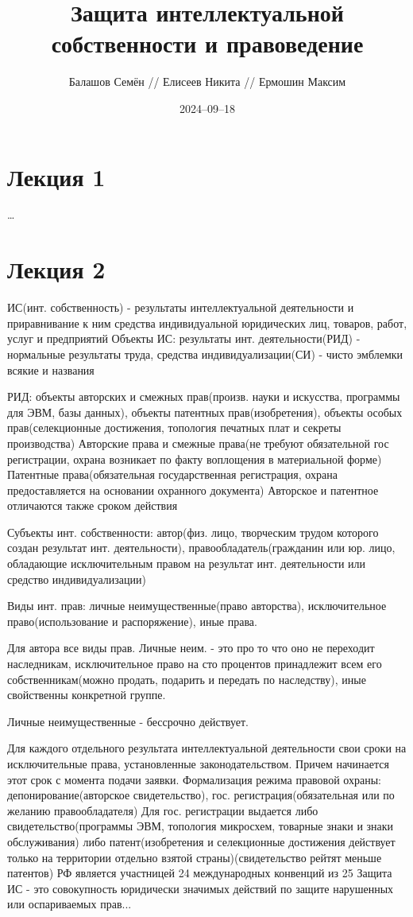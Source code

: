\documentclass[12pt]{article}
\title{Защита интеллектуальной собственности и правоведение}
\author{Балашов Семён // Елисеев Никита // Ермошин Максим}
\date{2024–09–18}
\begin{document}
\maketitle

\section{Лекция 1}

\dots

\section{Лекция 2}

ИС(инт. собственность) - результаты интеллектуальной деятельности и приравнивание к ним средства индивидуальной юридических лиц, товаров, работ, услуг и предприятий
Объекты ИС: результаты инт. деятельности(РИД) - нормальные результаты труда, средства индивидуализации(СИ) - чисто эмблемки всякие и названия
	
РИД: объекты авторских и смежных прав(произв. науки и искусства, программы для ЭВМ, базы данных), объекты патентных прав(изобретения), объекты особых прав(селекционные достижения, топология печатных плат и секреты производства)
	Авторские права и смежные права(не требуют обязательной гос регистрации, охрана возникает по факту воплощения в материальной форме)
Патентные права(обязательная государственная регистрация, охрана предоставляется на основании охранного документа)
Авторское и патентное отличаются также сроком действия

Субъекты инт. собственности: автор(физ. лицо, творческим трудом которого создан результат инт. деятельности), правообладатель(гражданин или юр. лицо, обладающие исключительным правом на результат инт. деятельности или средство индивидуализации)

Виды инт. прав: личные неимущественные(право авторства), исключительное право(использование и распоряжение), иные права.

Для автора все виды прав. Личные неим. - это про то что оно не переходит наследникам, исключительное право на сто процентов принадлежит всем его собственникам(можно продать, подарить и передать по наследству), иные свойственны конкретной группе.

Личные неимущественные - бессрочно действует.

Для каждого отдельного результата интеллектуальной деятельности свои сроки на исключительные права, установленные законодательством. Причем начинается этот срок с момента подачи заявки.
	Формализация режима правовой охраны: депонирование(авторское свидетельство), гос. регистрация(обязательная или по желанию правообладателя)
	Для гос. регистрации выдается либо свидетельство(программы ЭВМ, топология микросхем, товарные знаки и знаки обслуживания) либо патент(изобретения и селекционные достижения действует только на территории отдельно взятой страны)(свидетельство рейтят меньше патентов)
	РФ является участницей 24 международных конвенций из 25
	Защита ИС - это совокупность юридически значимых действий по защите нарушенных или оспариваемых прав...
\end{document}
